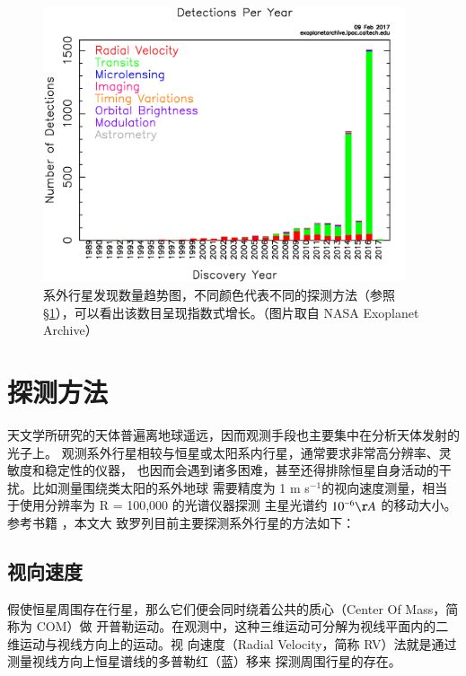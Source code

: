 \begin{figure}[hb]
\centering
\includegraphics[width=0.95\textwidth]{figures/chapter1/fig3_nasaexo_dischist.jpg}
\caption{系外行星发现数量趋势图，不同颜色代表不同的探测方法（参照 \S \ref{sec:detmeth}），可以看出该数目呈现指数式增长。（图片取自 NASA Exoplanet Archive）}
\label{fig:pltdiscyear}
\end{figure}



\section{探测方法} \label{sec:detmeth}

天文学所研究的天体普遍离地球遥远，因而观测手段也主要集中在分析天体发射的光子上。
观测系外行星相较与恒星或太阳系内行星，通常要求非常高分辨率、灵敏度和稳定性的仪器，
也因而会遇到诸多困难，甚至还得排除恒星自身活动的干扰。比如测量围绕类太阳的系外地球
需要精度为 1 m s$^{-1}$的视向速度测量，相当于使用分辨率为 R = 100,000 的光谱仪器探测
主星光谱约 $10^{-6} \AA$ 的移动大小。参考书籍 ，本文大
致罗列目前主要探测系外行星的方法如下：

\subsection{视向速度}

假使恒星周围存在行星，那么它们便会同时绕着公共的质心（Center Of Mass，简称为 COM）做
开普勒运动。在观测中，这种三维运动可分解为视线平面内的二维运动与视线方向上的运动。视
向速度（Radial Velocity，简称 RV）法就是通过测量视线方向上恒星谱线的多普勒红（蓝）移来
探测周围行星的存在。

